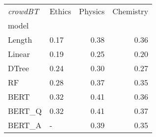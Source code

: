 \begin{tabular}{llrr}
\toprule
\textit{crowdBT} & Ethics &  Physics &  Chemistry \\
model  &        &          &            \\
\midrule
Length &   0.17 &     0.38 &       0.36 \\
Linear &   0.19 &     0.25 &       0.20 \\
DTree  &   0.24 &     0.30 &       0.27 \\
RF     &   0.28 &     0.37 &       0.35 \\
BERT   &   0.32 &     0.41 &       0.36 \\
BERT\_Q &   0.32 &     0.41 &       0.37 \\
BERT\_A &      - &     0.39 &       0.35 \\
\bottomrule
\end{tabular}
